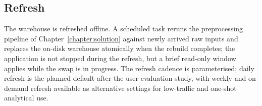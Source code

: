 \subsection{Refresh}
\label{sec:future:deployment:refresh}

The warehouse is refreshed offline. A scheduled task reruns the
preprocessing pipeline of Chapter~\ref{chapter:solution} against newly
arrived raw inputs and replaces the on-disk warehouse atomically when the
rebuild completes; the application is not stopped during the refresh, but
a brief read-only window applies while the swap is in progress. The refresh
cadence is parameterised; daily refresh is the planned default after the
user-evaluation study, with weekly and on-demand refresh available as
alternative settings for low-traffic and one-shot analytical use.

